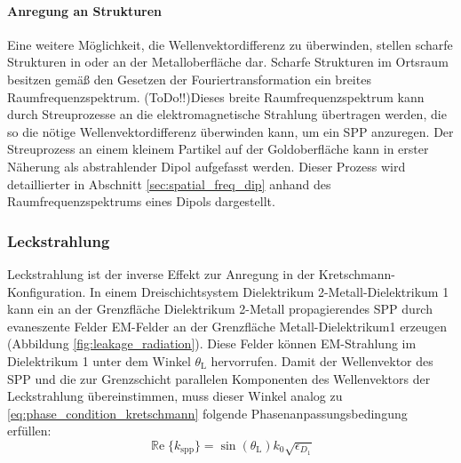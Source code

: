 \documentclass[titlepage,  ngerman]{article}
\renewcommand{\Re}{\operatorname{\mathbb{R}e}}
\begin{document}
	\paragraph{Anregung an Strukturen}
	Eine weitere Möglichkeit, die Wellenvektordifferenz zu überwinden, stellen scharfe Strukturen in oder an der Metalloberfläche dar. Scharfe Strukturen im Ortsraum besitzen gemäß den Gesetzen der Fouriertransformation ein breites Raumfrequenzspektrum. (ToDo!!)Dieses breite Raumfrequenzspektrum kann durch Streuprozesse an die elektromagnetische Strahlung übertragen werden, die so die nötige Wellenvektordifferenz überwinden kann, um ein SPP anzuregen. Der Streuprozess an einem kleinem Partikel auf der Goldoberfläche kann in erster Näherung als abstrahlender Dipol aufgefasst werden. Dieser Prozess wird detaillierter in Abschnitt \ref{sec:spatial_freq_dip} anhand des Raumfrequenzspektrums eines Dipols dargestellt.
	\subsubsection{Leckstrahlung}
	\label{sec:leakage_radiation}
	Leckstrahlung ist der inverse Effekt zur Anregung in der Kretschmann-Konfiguration. In einem Dreischichtsystem Dielektrikum 2-Metall-Dielektrikum 1 kann ein an der Grenzfläche Dielektrikum 2-Metall propagierendes SPP durch evaneszente Felder EM-Felder an der Grenzfläche Metall-Dielektrikum1 erzeugen (Abbildung \ref{fig:leakage_radiation}). Diese Felder können EM-Strahlung im Dielektrikum 1 unter dem Winkel $\theta_\mathrm{L}$ hervorrufen. Damit der Wellenvektor des SPP und die zur Grenzschicht parallelen Komponenten des Wellenvektors der Leckstrahlung übereinstimmen, muss dieser Winkel analog zu \eqref{eq:phase_condition_kretschmann} folgende Phasenanpassungsbedingung erfüllen:
	\begin{equation}
		\label{eq:phase_condition}
		\boxed{\Re\{k_{\mathrm{spp}}\}=\sin(\theta_\mathrm{L}) k_0 \sqrt{\epsilon_{D_1}}}
	\end{equation}
	
\end{document}
